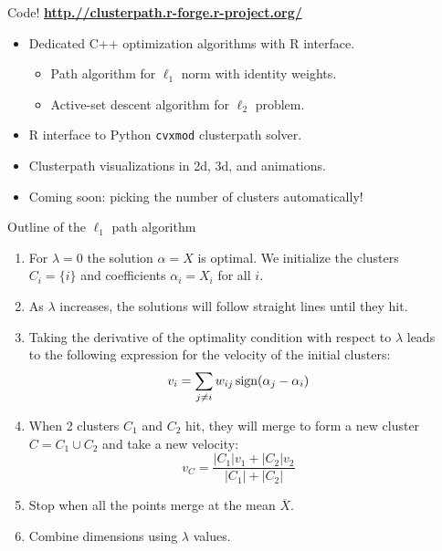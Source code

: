 \documentclass[final]{beamer}
\begin{document}
\begin{frame}{}
\begin{columns}[T]
\begin{column}{0.315\linewidth}
\end{column}\hfill
\begin{column}{0.315\linewidth}
\begin{alertblock}{Code!
    \textbf{\url{http.//clusterpath.r-forge.r-project.org/}}}
\begin{itemize}
\item Dedicated C++ optimization algorithms with R interface.
  \begin{itemize}
  \item Path algorithm for $\ell_1$ norm with identity weights.
  \item Active-set descent algorithm for $\ell_2$ problem.
  \end{itemize}
\item R interface to Python \texttt{cvxmod} clusterpath solver.
\item Clusterpath visualizations in 2d, 3d, and animations.
\item Coming soon: picking the number of clusters automatically!
\end{itemize}
\end{alertblock}


\begin{block}{Outline of the $\ell_1$ path algorithm}
\begin{enumerate}
\item For $\lambda=0$ the solution $\alpha=X$ is optimal. We
  initialize the clusters $C_i = \{i\}$ and coefficients $\alpha_i =
  X_i$ for all $i$.
\item As $\lambda$ increases, the solutions will follow straight
  lines until they hit.
\item Taking the derivative of the optimality condition with respect
  to $\lambda$ leads to the following expression for the velocity of
  the initial clusters:
$$v_i = \sum_{j\neq i}w_{ij}\operatorname{sign}(\alpha_j-\alpha_i)$$
\item When 2 clusters $C_1$ and $C_2$ hit, they will merge to form a
  new cluster $C = C_1\cup C_2$ and take a new velocity:
$$v_C = \frac{
|C_1|v_1 + |C_2|v_2
}{
|C_1|+|C_2|
}$$
\item Stop when all the points merge at the mean $\overline X$.
\item Combine dimensions using $\lambda$ values.
\end{enumerate}

\end{block}




\end{column}
\end{columns}
\end{frame}
\end{document}
